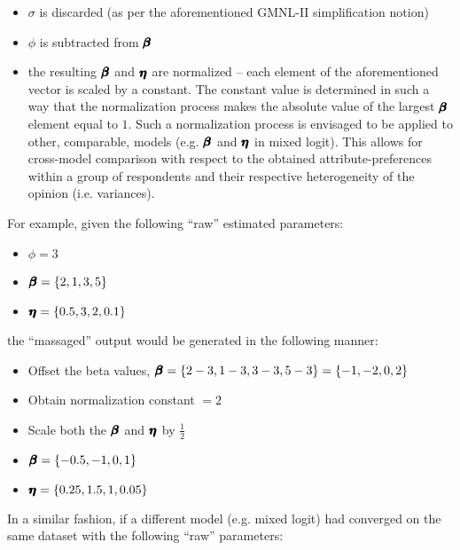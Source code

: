 \documentclass[12pt,a4paper]{article}
\begin{document}
\begin{itemize}

\item \(\sigma\) is discarded (as per the aforementioned GMNL-II simplification notion)

\item \( \phi \) is subtracted from \( \pmb{\hm{\beta}} \)

\item the resulting \( \pmb{\hm{\beta}} \) and \( \pmb{\hm{\eta}} \) are normalized -- each element of the aforementioned vector is scaled by a constant. The constant value is determined in such a way that the normalization process makes the absolute value of the largest \( \pmb{\hm{\beta}} \) element equal to \(1\). Such a normalization process is envisaged to be applied to other, comparable, models (e.g. \( \pmb{\hm{\beta}} \) and \( \pmb{\hm{\eta}} \) in mixed logit). This allows for cross-model comparison with respect to the obtained attribute-preferences within a group of respondents and their respective heterogeneity of the opinion (i.e. variances).
\end{itemize}

For example, given the following ``raw'' estimated parameters:

\begin{itemize}
\item \( \phi = 3 \)
\item \(\pmb{\hm{\beta}} = \{2, 1, 3, 5\}\)
\item \(\pmb{\hm{\eta}} = \{0.5, 3, 2, 0.1\}\)
\end{itemize}

the ``massaged'' output would be generated in the following manner:

\begin{itemize}
\item Offset the beta values, \(\pmb{\hm{\beta}} = \{2-3, 1-3, 3-3, 5-3\} = \{-1, -2, 0, 2\}\)
\item Obtain normalization constant \(=2\)
\item Scale both the \( \pmb{\hm{\beta}} \) and \( \pmb{\hm{\eta}} \) by \(\frac{1}{2}\)
\item \(\pmb{\hm{\beta}} = \{-0.5, -1, 0, 1\}\)
\item \(\pmb{\hm{\eta}} = \{0.25, 1.5, 1, 0.05\}\)
\end{itemize}

In a similar fashion, if a different model (e.g. mixed logit) had converged on the same dataset with the following ``raw'' parameters:
\end{document}
